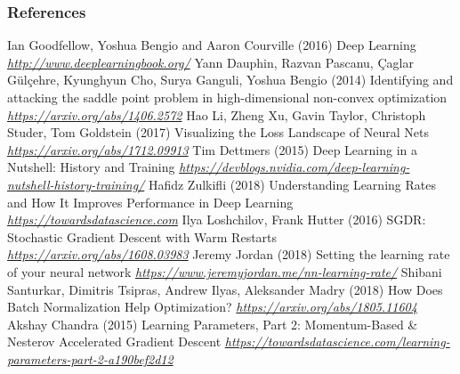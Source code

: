 \begin{vbframe}
\frametitle{References}
\footnotesize{
\begin{thebibliography}{99}
 Ian Goodfellow, Yoshua Bengio and Aaron Courville (2016)
\newblock Deep Learning
\newblock \emph{\url{http://www.deeplearningbook.org/}}
 Yann Dauphin, Razvan Pascanu, {\c{C}}aglar G{\"{u}}l{\c{c}}ehre, Kyunghyun Cho, Surya Ganguli, Yoshua Bengio (2014)
\newblock Identifying and attacking the saddle point problem in high-dimensional non-convex optimization
\newblock \emph{\url{https://arxiv.org/abs/1406.2572}}
 Hao Li, Zheng Xu, Gavin Taylor, Christoph Studer, Tom Goldstein (2017)
\newblock Visualizing the Loss Landscape of Neural Nets
\newblock \emph{\url{https://arxiv.org/abs/1712.09913}}
 Tim Dettmers (2015)
\newblock Deep Learning in a Nutshell: History and Training
\newblock \emph{\url{https://devblogs.nvidia.com/deep-learning-nutshell-history-training/}}
 Hafidz Zulkifli (2018)
\newblock Understanding Learning Rates and How It Improves Performance in Deep Learning
\newblock \emph{\url{https://towardsdatascience.com}}
 Ilya Loshchilov, Frank Hutter (2016)
\newblock SGDR: Stochastic Gradient Descent with Warm Restarts
\newblock \emph{\url{https://arxiv.org/abs/1608.03983}}
 Jeremy Jordan (2018)
\newblock Setting the learning rate of your neural network
\newblock \emph{\url{https://www.jeremyjordan.me/nn-learning-rate/}}
 Shibani Santurkar, Dimitris Tsipras, Andrew Ilyas, Aleksander Madry (2018)
\newblock How Does Batch Normalization Help Optimization?
\newblock \emph{\url{https://arxiv.org/abs/1805.11604}}
 Akshay Chandra (2015) 
\newblock Learning Parameters, Part 2: Momentum-Based \& Nesterov Accelerated Gradient Descent
\newblock \emph{\url{https://towardsdatascience.com/learning-parameters-part-2-a190bef2d12}}
\end{thebibliography}
}
\end{vbframe}

\endlecture











